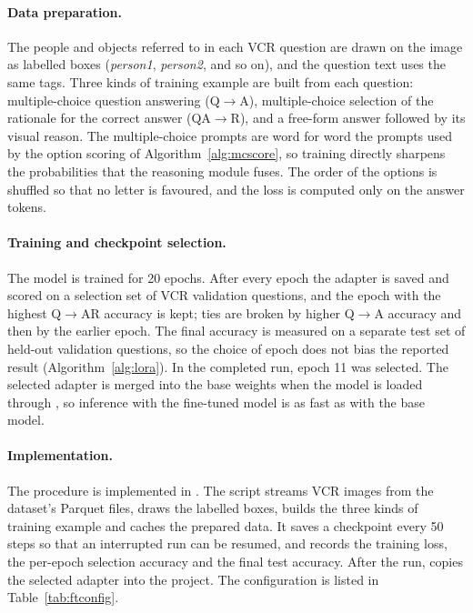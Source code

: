 \documentclass[12pt,a4paper,oneside]{report}
\newcommand{\QtoA}{Q$\rightarrow$A}
\newcommand{\QAtoR}{QA$\rightarrow$R}
\newcommand{\QtoAR}{Q$\rightarrow$AR}
\begin{document}
\paragraph{Data preparation.} The people and objects referred to in each VCR
question are drawn on the image as labelled boxes (\emph{person1},
\emph{person2}, and so on), and the question text uses the same tags. Three
kinds of training example are built from each question: multiple-choice
question answering (\QtoA), multiple-choice selection of the rationale for the
correct answer (\QAtoR), and a free-form answer followed by its visual reason.
The multiple-choice prompts are word for word the prompts used by the option
scoring of Algorithm~\ref{alg:mcscore}, so training directly sharpens the
probabilities that the reasoning module fuses. The order of the options is
shuffled so that no letter is favoured, and the loss is computed only on the
answer tokens.

\paragraph{Training and checkpoint selection.} The model is trained for 20
epochs. After every epoch the adapter is saved and scored on a selection set of
VCR validation questions, and the epoch with the highest \QtoAR{} accuracy is
kept; ties are broken by higher \QtoA{} accuracy and then by the earlier epoch.
The final accuracy is measured on a separate test set of held-out validation
questions, so the choice of epoch does not bias the reported result
(Algorithm~\ref{alg:lora}). In the completed run, epoch 11 was selected. The
selected adapter is merged into the base weights when the model is loaded
through , so inference with the fine-tuned model is
as fast as with the base model.

\paragraph{Implementation.} The procedure is implemented in
. The script streams VCR images from the
dataset's Parquet files, draws the labelled boxes, builds the three kinds of
training example and caches the prepared data. It saves a checkpoint every 50
steps so that an interrupted run can be resumed, and records the training loss,
the per-epoch selection accuracy and the final test accuracy. After the run,
 copies the selected adapter into the project. The
configuration is listed in Table~\ref{tab:ftconfig}.
\end{document}
